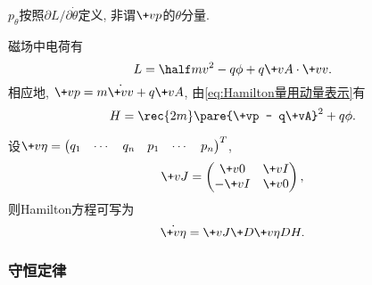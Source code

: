 \documentclass[../TheoreticalMechanics.tex]{subfiles}
\begin{document}
\begin{pitfall}
    $p_\theta$按照$\partial L/\partial \dot{\theta}$定义, 非谓$\+vp$的$\theta$分量.
\end{pitfall}
\begin{ex}
    磁场中电荷有
    \[ L = \half mv^2 - q\phi + q\+vA\cdot\+vv. \]
    相应地, $\+vp = m\dot{\+vv} + q\+vA$, 由\eqref{eq:Hamilton量用动量表示}有
    \[ H = \rec{2m}\pare{\+vp - q\+vA}^2 + q\phi. \]
\end{ex}
\begin{finale}
    \begin{theorem}[辛形式方程]
        设$\+v\eta = \begin{pmatrix}
            q_1 & \cdots & q_n & p_1 & \cdots & p_n
        \end{pmatrix}^T$,
        \[ \+vJ = \begin{pmatrix}
            \+v0 & \+vI\\
            -\+vI & \+v0
        \end{pmatrix}, \]
        则Hamilton方程可写为
        \begin{equation}
            \label{eq:辛形式Hamilton方程}
            \dot{\+v\eta} = \+vJ\+D{\+v\eta}DH. 
        \end{equation}
    \end{theorem}
\end{finale}


\subsubsection{守恒定律} %
\label{ssub:守恒定律}
\end{document}
